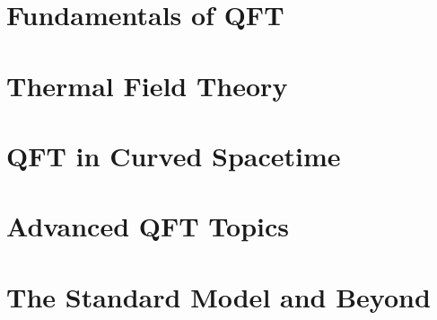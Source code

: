 \documentclass[a4paper,11pt]{book}
\begin{document}
\frontmatter


\newpage

\newpage

\newpage
\tableofcontents
\mainmatter



\part{Fundamentals of QFT}
















\part{Thermal Field Theory}










\part{QFT in Curved Spacetime}





\part{Advanced QFT Topics}



\part{The Standard Model and Beyond}
\end{document}
